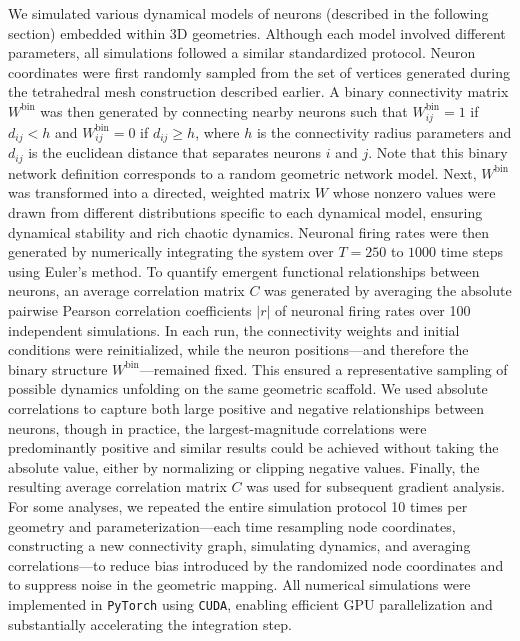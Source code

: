 \documentclass{article}
\begin{document}
We simulated various dynamical models of neurons (described in the following section) embedded within 3D geometries. Although each model involved different parameters, all simulations followed a similar standardized protocol. Neuron coordinates were first randomly sampled from the set of vertices generated during the tetrahedral mesh construction described earlier. A binary connectivity matrix $W^{\text{bin}}$ was then generated by connecting nearby neurons such that $W^{\text{bin}}_{ij}=1$ if $d_{ij} < h$ and $W^{\text{bin}}_{ij}=0$ if $d_{ij} \geq h$, where $h$ is the connectivity radius parameters and $d_{ij}$ is the euclidean distance that separates neurons $i$ and $j$. Note that this binary network definition corresponds to a random geometric network model\cite{penrose2003random}. Next, $W^{\text{bin}}$ was transformed into a directed, weighted matrix $W$ whose nonzero values were drawn from different distributions specific to each dynamical model, ensuring dynamical stability and rich chaotic dynamics. Neuronal firing rates were then generated by numerically integrating the system over $T=250$ to $1000$ time steps using Euler's method. To quantify emergent functional relationships between neurons, an average correlation matrix $C$ was generated by averaging the absolute pairwise Pearson correlation coefficients $|r|$ of neuronal firing rates over 100 independent simulations. In each run, the connectivity weights and initial conditions were reinitialized, while the neuron positions---and therefore the binary structure $W^{\text{bin}}$---remained fixed. This ensured a representative sampling of possible dynamics unfolding on the same geometric scaffold. We used absolute correlations to capture both large positive and negative relationships between neurons, though in practice, the largest-magnitude correlations were predominantly positive and similar results could be achieved without taking the absolute value, either by normalizing or clipping negative values. Finally, the resulting average correlation matrix $C$ was used for subsequent gradient analysis. For some analyses, we repeated the entire simulation protocol 10 times per geometry and parameterization---each time resampling node coordinates, constructing a new connectivity graph, simulating dynamics, and averaging correlations---to reduce bias introduced by the randomized node coordinates and to suppress noise in the geometric mapping. All numerical simulations were implemented in \verb|PyTorch| using \verb|CUDA|, enabling efficient GPU parallelization and substantially accelerating the integration step.
\end{document}
